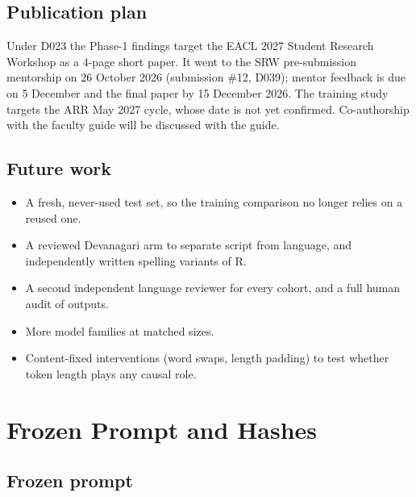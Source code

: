 \documentclass[12pt,a4paper,oneside]{report}
\renewcommand{\_}{\oldunderscore\allowbreak}
\begin{document}
\section{Publication plan}

Under D023 the Phase-1 findings target the EACL 2027 Student Research Workshop as a 4-page short paper. It went to the SRW pre-submission mentorship on 26 October 2026 (submission \#12, D039); mentor feedback is due on 5 December and the final paper by 15 December 2026. The training study targets the ARR May 2027 cycle, whose date is not yet confirmed. Co-authorship with the faculty guide will be discussed with the guide.

\section{Future work}

\begin{itemize}
\item A fresh, never-used test set, so the training comparison no longer relies on a reused one.
\item A reviewed Devanagari arm to separate script from language, and independently written spelling variants of R.
\item A second independent language reviewer for every cohort, and a full human audit of outputs.
\item More model families at matched sizes.
\item Content-fixed interventions (word swaps, length padding) to test whether token length plays any causal role.
\end{itemize}

\cleardoublepage
{}
{}
\renewcommand{\bibname}{References}
{

}

\appendix

\chapter{Frozen Prompt and Hashes}
\label{app:prompt}

\section*{Frozen prompt}
\end{document}
